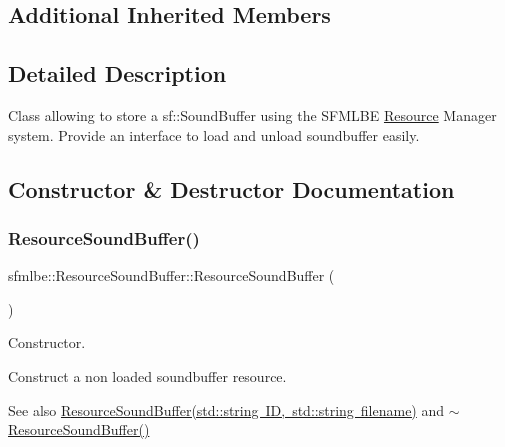 \subsection*{Additional Inherited Members}


\subsection{Detailed Description}
Class allowing to store a sf\+::\+Sound\+Buffer using the S\+F\+M\+L\+BE \mbox{\hyperlink{classsfmlbe_1_1_resource}{Resource}} Manager system. Provide an interface to load and unload soundbuffer easily. 

\subsection{Constructor \& Destructor Documentation}
\mbox{\label{classsfmlbe_1_1_resource_sound_buffer_a88d7088f7f0e02879c0a62563851cb67}} 
\subsubsection{\texorpdfstring{Resource\+Sound\+Buffer()}{ResourceSoundBuffer()}\hspace{0.1cm}{\footnotesize\ttfamily [1/2]}}
{\footnotesize\ttfamily sfmlbe\+::\+Resource\+Sound\+Buffer\+::\+Resource\+Sound\+Buffer (\begin{DoxyParamCaption}{ }\end{DoxyParamCaption})}



Constructor. 

Construct a non loaded soundbuffer resource. \begin{DoxySeeAlso}{See also}
\mbox{\hyperlink{classsfmlbe_1_1_resource_sound_buffer_a6f01706abb7c87383e0ddffbf8650837}{Resource\+Sound\+Buffer(std\+::string I\+D, std\+::string filename)}} and \mbox{\hyperlink{classsfmlbe_1_1_resource_sound_buffer_a28e17a59ffd9de59eb6394ed564efc11}{$\sim$\+Resource\+Sound\+Buffer()}} 
\end{DoxySeeAlso}
\mbox{\label{classsfmlbe_1_1_resource_sound_buffer_a6f01706abb7c87383e0ddffbf8650837}} 
